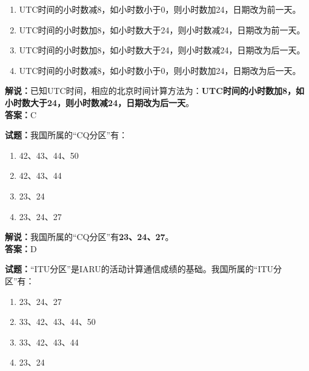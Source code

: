 \documentclass{ctexbook}
\begin{document}
\begin{enumerate}[leftmargin=3em]
	\item UTC时间的小时数减8，如小时数小于0，则小时数加24，日期改为前一天。
	\item UTC时间的小时数加8，如小时数大于24，则小时数减24，日期改为前一天。
	\item UTC时间的小时数加8，如小时数大于24，则小时数减24，日期改为后一天。
	\item UTC时间的小时数减8，如小时数小于0，则小时数加24，日期改为后一天。
\end{enumerate}

\noindent\textbf{解说：}已知UTC时间，相应的北京时间计算方法为：\textbf{UTC时间的小时数加8，如小时数大于24，则小时数减24，日期改为后一天}。\\\noindent\textbf{答案：}C


\bigskip


\noindent\textbf{试题：}我国所属的“CQ分区”有：

\begin{enumerate}[leftmargin=3em]
	\item 42、43、44、50
	\item 42、43、44
	\item 23、24
	\item 23、24、27
\end{enumerate}

\noindent\textbf{解说：}我国所属的“CQ分区”有\textbf{23、24、27}。\\\noindent\textbf{答案：}D


\bigskip


\noindent\textbf{试题：}“ITU分区”是IARU的活动计算通信成绩的基础。我国所属的“ITU分区”有：

\begin{enumerate}[leftmargin=3em]
	\item 23、24、27
	\item 33、42、43、44、50
	\item 33、42、43、44
	\item 23、24
\end{enumerate}
\end{document}
